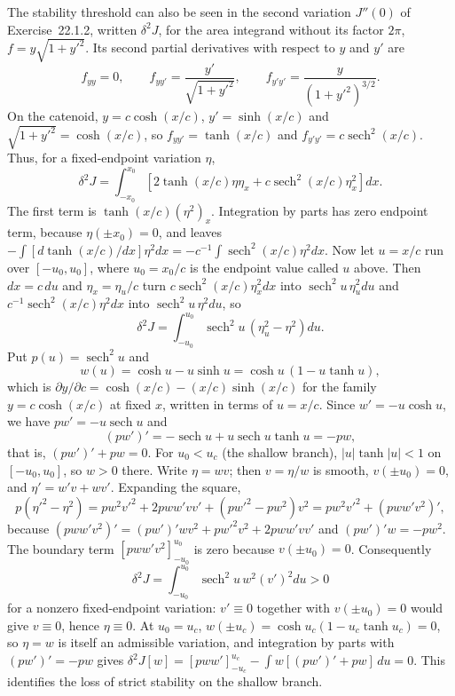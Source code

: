 The stability threshold can also be seen in the second variation
$J''(0)$ of Exercise~22.1.2, written $\delta^2J$, for the area integrand
without its factor $2\pi$, $f=y\sqrt{1+y'^2}$. Its second partial
derivatives with respect to $y$ and $y'$ are
\[
 f_{yy}=0,\qquad f_{yy'}=\frac{y'}{\sqrt{1+y'^2}},\qquad
 f_{y'y'}=\frac y{(1+y'^2)^{3/2}}.
\]
On the catenoid, $y=c\cosh(x/c)$, $y'=\sinh(x/c)$ and
$\sqrt{1+y'^2}=\cosh(x/c)$, so $f_{yy'}=\tanh(x/c)$ and
$f_{y'y'}=c\operatorname{sech}^2(x/c)$.
Thus, for a fixed-endpoint variation $\eta$,
\[
 \delta^2J=\int_{-x_0}^{x_0}
 \left[2\tanh(x/c)\eta\eta_x
       +c\operatorname{sech}^2(x/c)\eta_x^2\right]dx.
\]
The first term is $\tanh(x/c)(\eta^2)_x$. Integration by parts
has zero endpoint term, because $\eta(\pm x_0)=0$, and leaves
$-\int[d\tanh(x/c)/dx]\eta^2dx
=-c^{-1}\int\operatorname{sech}^2(x/c)\eta^2dx$.
Now let $u=x/c$ run over $[-u_0,u_0]$, where $u_0=x_0/c$ is the
endpoint value called $u$ above. Then $dx=c\,du$ and
$\eta_x=\eta_u/c$ turn
$c\operatorname{sech}^2(x/c)\eta_x^2dx$ into
$\operatorname{sech}^2u\,\eta_u^2du$ and
$c^{-1}\operatorname{sech}^2(x/c)\eta^2dx$ into
$\operatorname{sech}^2u\,\eta^2du$, so
\[
\delta^2J=\int_{-u_0}^{u_0}
\operatorname{sech}^2u\,(\eta_u^2-\eta^2)du.
\]
Put $p(u)=\operatorname{sech}^2u$ and
\[
w(u)=\cosh u-u\sinh u=\cosh u\,(1-u\tanh u),
\]
which is $\partial y/\partial c=\cosh(x/c)-(x/c)\sinh(x/c)$ for the
family $y=c\cosh(x/c)$ at fixed $x$, written in terms of $u=x/c$.
Since $w'=-u\cosh u$, we have $pw'=-u\operatorname{sech}u$ and
\[
(pw')'=-\operatorname{sech}u+u\operatorname{sech}u\tanh u=-pw,
\]
that is, $(pw')'+pw=0$. For $u_0<u_c$ (the shallow branch),
$|u|\tanh|u|<1$ on $[-u_0,u_0]$, so $w>0$ there. Write $\eta=wv$;
then $v=\eta/w$ is smooth, $v(\pm u_0)=0$, and $\eta'=w'v+wv'$.
Expanding the square,
\[
 p(\eta'^2-\eta^2)
 =pw^2v'^2+2pww'vv'+(pw'^2-pw^2)v^2
 =pw^2v'^2+(pww'v^2)',
\]
because $(pww'v^2)'=(pw')'wv^2+pw'^2v^2+2pww'vv'$ and
$(pw')'w=-pw^2$. The boundary term $[pww'v^2]_{-u_0}^{u_0}$ is zero
because $v(\pm u_0)=0$. Consequently
\[
\delta^2J=\int_{-u_0}^{u_0}
\operatorname{sech}^2u\,w^2(v')^2du>0
\]
for a nonzero fixed-endpoint variation: $v'\equiv0$ together with
$v(\pm u_0)=0$ would give $v\equiv0$, hence $\eta\equiv0$. At
$u_0=u_c$, $w(\pm u_c)=\cosh u_c(1-u_c\tanh u_c)=0$, so $\eta=w$ is
itself an admissible variation, and integration by parts with
$(pw')'=-pw$ gives
$\delta^2J[w]=[pww']_{-u_c}^{u_c}-\int w[(pw')'+pw]\,du=0$.
This identifies the loss of strict stability on the shallow branch.


